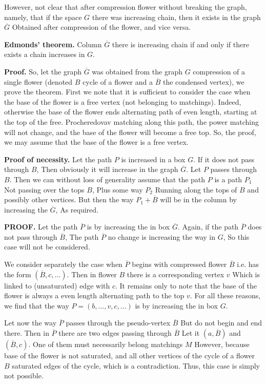 However, not clear that after compression flower without breaking the graph, namely, that if the space $G$ there was increasing chain, then it exists in the graph $\overline G$ Obtained after compression of the flower, and vice versa.

\textbf{Edmonds' theorem.} Column $\overline G$ there is increasing chain if and only if there exists a chain increases in $G$.

\textbf{Proof.} So, let the graph $\overline G$ was obtained from the graph $G$ compression of a single flower (denoted $B$ cycle of a flower and a $\overline B$ the condensed vertex), we prove the theorem. First we note that it is sufficient to consider the case when the base of the flower is a free vertex (not belonging to matchings). Indeed, otherwise the base of the flower ends alternating path of even length, starting at the top of the free. Procheredovav matching along this path, the power matching will not change, and the base of the flower will become a free top. So, the proof, we may assume that the base of the flower is a free vertex.

\textbf{Proof of necessity.} Let the path $P$ is increased in a box $G$. If it does not pass through $B$, Then obviously it will increase in the graph $\overline G$. Let $P$ passes through $B$. Then we can without loss of generality assume that the path $P$ is a path $P_1$ Not passing over the tops $B$, Plus some way $P_2$ Running along the tops of $B$ and possibly other vertices. But then the way $P_1 + \overline B$ will be in the column by increasing the $\overline G$, As required.

\textbf{PROOF.} Let the path $\overline P$ is by increasing the in box $\overline G$. Again, if the path $\overline P$ does not pass through $\overline B$, The path $\overline P$ no change is increasing the way in $G$, So this case will not be considered.

We consider separately the case when $\overline P$ begins with compressed flower $\overline B$ i.e. has the form $(\overline B, c, \ldots)$. Then in flower $B$ there is a corresponding vertex $v$ Which is linked to (unsaturated) edge with $c$. It remains only to note that the base of the flower is always a even length alternating path to the top $v$. For all these reasons, we find that the way $P = (b, \ldots, v, c,...)$ is by increasing the in box $G$.

Let now the way $\overline P$ passes through the pseudo-vertex $\overline B$ But do not begin and end there. Then in $\overline P$ there are two edges passing through $\overline B$ Let it $(a, \overline B)$ and $(\overline B, c)$. One of them must necessarily belong matchings $M$ However, because base of the flower is not saturated, and all other vertices of the cycle of a flower $B$ saturated edges of the cycle, which is a contradiction. Thus, this case is simply not possible.

